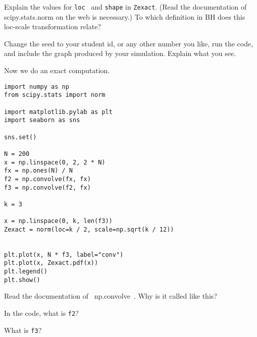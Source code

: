 \documentclass[assignments]{subfiles}
\begin{document}
\begin{exercise}
Explain the values for \verb|loc|~ and \verb|shape| in \verb|Zexact|.
  (Read the documentation of scipy.stats.norm on the web is necessary.)
  To which definition in BH does this loc-scale transformation relate?
\begin{solution}
\end{solution}
\end{exercise}


\begin{exercise}
Change the seed to your student id, or any other number you like, run the code, and include the graph produced by your simulation.
Explain what you see.
\begin{solution}
\end{solution}
\end{exercise}


Now we do an exact computation.

\begin{verbatim}
import numpy as np
from scipy.stats import norm

import matplotlib.pylab as plt
import seaborn as sns

sns.set()

N = 200
x = np.linspace(0, 2, 2 * N)
fx = np.ones(N) / N
f2 = np.convolve(fx, fx)
f3 = np.convolve(f2, fx)

k = 3

x = np.linspace(0, k, len(f3))
Zexact = norm(loc=k / 2, scale=np.sqrt(k / 12))


plt.plot(x, N * f3, label="conv")
plt.plot(x, Zexact.pdf(x))
plt.legend()
plt.show()
\end{verbatim}

\begin{exercise}
Read the documentation of ~np.convolve~. Why is it called like this?
\begin{solution}
\end{solution}
\end{exercise}

\begin{exercise}
In the code, what is \texttt{f2}?
\begin{solution}
\end{solution}
\end{exercise}

\begin{exercise}
What is \texttt{f3}?
\begin{solution}
\end{solution}
\end{exercise}
\end{document}
